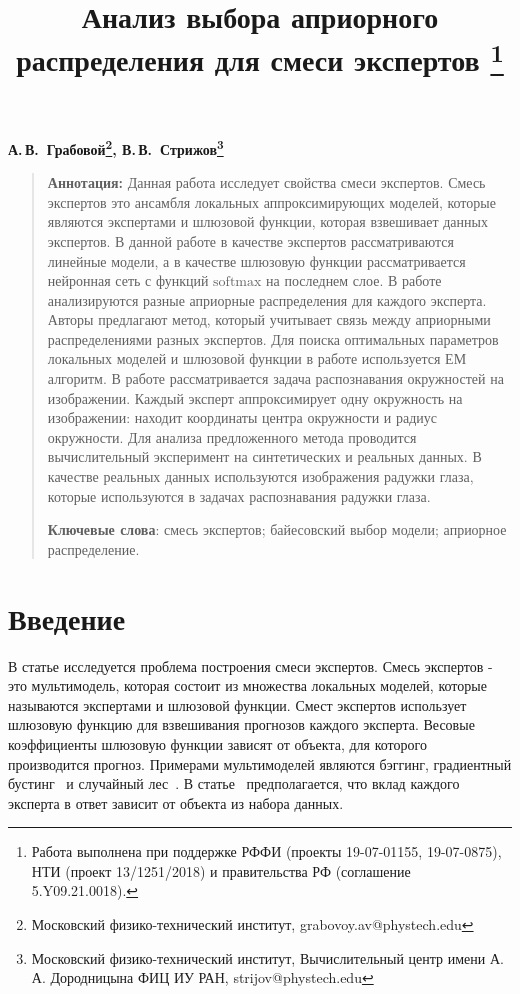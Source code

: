 \documentclass[12pt, twoside]{article}
\numberwithin{equation}{section}
\begin{document}
\title{\bf Анализ выбора априорного распределения для смеси экспертов \thanks{Работа выполнена при поддержке РФФИ (проекты 19-07-01155, 19-07-0875),  НТИ (проект 13/1251/2018) и правительства РФ (соглашение 5.Y09.21.0018).}}
\date{}
\author{}
\maketitle

\begin{center}
\bf
А.\,В.~Грабовой\footnote{Московский физико-технический институт, grabovoy.av@phystech.edu}, В.\,В.~Стрижов\footnote{Московский физико-технический институт, Вычислительный центр имени А.\,А. Дородницына ФИЦ ИУ РАН, strijov@phystech.edu}
\end{center}
{\centering\begin{quote}
\textbf{Аннотация:} 
Данная работа исследует свойства смеси экспертов. Смесь экспертов это ансамбля локальных аппроксимирующих моделей, которые являются экспертами и шлюзовой функции, которая взвешивает данных экспертов. В данной работе в качестве экспертов рассматриваются линейные модели, а в качестве шлюзовую функции рассматривается нейронная сеть с функций $\text{softmax}$ на последнем слое. В работе анализируются разные априорные распределения для каждого эксперта. Авторы предлагают метод, который учитывает связь между априорными распределениями разных экспертов. Для поиска оптимальных параметров локальных моделей и шлюзовой функции в работе используется ЕМ алгоритм. В работе рассматривается задача распознавания окружностей на изображении. Каждый эксперт аппроксимирует одну окружность на изображении: находит координаты центра окружности и радиус окружности. Для анализа предложенного метода проводится вычислительный эксперимент на синтетических и реальных данных. В качестве реальных данных используются изображения радужки глаза, которые используются в задачах распознавания радужки глаза.

\smallskip
\textbf{Ключевые слова}: смесь экспертов; байесовский выбор модели; априорное распределение.

\smallskip
\end{quote}
}

\section{Введение}
В статье исследуется проблема построения смеси экспертов.
Смесь экспертов - это мультимодель, которая состоит из множества локальных моделей, которые называются экспертами и шлюзовой функции.
Смест экспертов использует шлюзовую функцию для взвешивания прогнозов каждого эксперта.
Весовые коэффициенты шлюзовую функции зависят от объекта, для которого производится прогноз.
Примерами мультимоделей являются бэггинг,  градиентный бустинг~\cite{Tianqi2016} и случайный лес~\cite{Ishwaran2012}.
В статье~\cite{Yuksel2012} предполагается, что вклад каждого эксперта в ответ зависит от объекта из набора данных.
\end{document}
